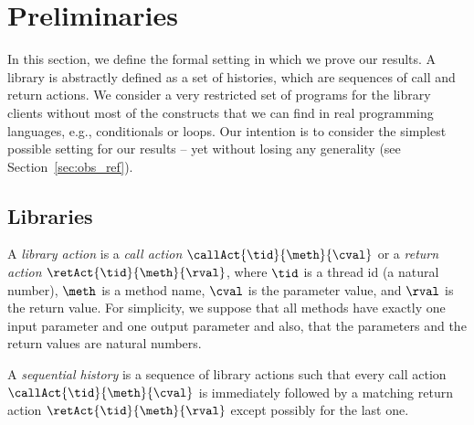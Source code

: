 \section{Preliminaries}
\label{sec:prelim}

In this section, we define the formal setting in which we prove our results. %
A library is abstractly defined as a set of histories, which are sequences of call and return actions.
We consider a very restricted set of programs for the library clients without most of the constructs that we can find in real programming languages, e.g., conditionals or loops.  Our intention is to consider the simplest possible setting for our results -- yet without losing any generality (see Section~\ref{sec:obs_ref}).

\subsection{Libraries} 

A \emph{library action} is a 
\emph {call action} $\callAct{\tid}{\meth}{\cval}$
or a \emph{return action} $\retAct{\tid}{\meth}{\rval}$,
where $\tid$ is a thread id (\ie a natural number), $\meth$ is a method name, $\cval$ is the parameter value,
and $\rval$ is the return value. For simplicity, we suppose that all methods have exactly one input parameter and one output parameter
and also, that the parameters and the return values are natural numbers. %

A \emph{sequential history} is a sequence of library actions such that every call action $\callAct{\tid}{\meth}{\cval}$ is immediately followed by a matching return action 
$\retAct{\tid}{\meth}{\rval}$ %
except possibly for the last one.

